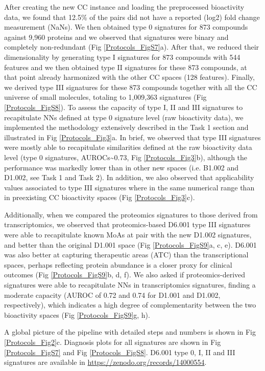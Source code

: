 After creating the new CC instance and loading the preprocessed bioactivity data, we found that 12.5\% of the pairs did not have a reported (log2) fold change measurement (NaNs). We then obtained type 0 signatures for 873 compounds against 9,960 proteins and we observed that signatures were binary and completely non-redundant (Fig \ref{Protocols_FigS7}a). After that, we reduced their dimensionality by generating type I signatures for 873 compounds with 544 features and we then obtained type II signatures for these 873 compounds, at that point already harmonized with the other CC spaces (128 features). Finally, we derived type III signatures for these 873 compounds together with all the CC universe of small molecules, totaling to 1,009,363 signatures (Fig \ref{Protocols_FigS8}). To assess the capacity of type I, II and III signatures to recapitulate NNs defined at type 0 signature level (raw bioactivity data), we implemented the methodology extensively described in the Task 1 section and illustrated in Fig \ref{Protocols_Fig3}a. In brief, we observed that type III signatures were mostly able to recapitulate similarities defined at the raw bioactivity data level (type 0 signatures, AUROCs\textasciitilde0.73, Fig \ref{Protocols_Fig3}b), although the performance was markedly lower than in other new spaces (i.e. B1.002 and D1.002, see Task 1 and Task 2). In addition, we also observed that applicability values associated to type III signatures where in the same numerical range than in preexisting CC bioactivity spaces (Fig \ref{Protocols_Fig3}c).


Additionally, when we compared the proteomics signatures to those derived from transcriptomics, we observed that proteomics-based D6.001 type III signatures were able to recapitulate known MoAs at pair with the new D1.002 signatures, and better than the original D1.001 space (Fig \ref{Protocols_FigS9}a, c, e). D6.001 was also better at capturing therapeutic areas (ATC) than the transcriptional spaces, perhaps reflecting protein abundance is a closer proxy for clinical outcomes (Fig \ref{Protocols_FigS9}b, d, f). We also asked if proteomics-derived signatures were able to recapitulate NNs in transcriptomics signatures, finding a moderate capacity (AUROC of 0.72 and 0.74 for D1.001 and D1.002, respectively), which indicates a high degree of complementarity between the two bioactivity spaces (Fig \ref{Protocols_FigS9}g, h).

A global picture of the pipeline with detailed steps and numbers is shown in Fig \ref{Protocols_Fig2}c. Diagnosis plots for all signatures are shown in Fig \ref{Protocols_FigS7} and Fig \ref{Protocols_FigS8}. D6.001 type 0, I, II and III signatures are available in \hyperlink{https://zenodo.org/records/14000554}{https://zenodo.org/records/14000554}. 

